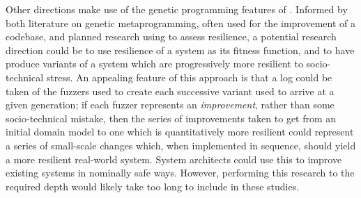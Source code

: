 \documentclass{article}
\begin{document}
Other directions make use of the genetic programming features of \pdsf{}.
Informed by both literature on genetic metaprogramming, often used for the
improvement of a codebase, and planned research using \pdsf{} to assess
resilience, a potential research direction could be to use resilience of a
system as its fitness function, and to have \pdsf{} produce variants of a
system which are progressively more resilient to socio-technical stress. An
appealing feature of this approach is that a log could be taken of the fuzzers
used to create each successive variant used to arrive at a given generation; if
each fuzzer represents an \emph{improvement}, rather than some socio-technical
mistake, then the series of improvements taken to get from an initial domain
model to one which is quantitatively more resilient could represent a series of
small-scale changes which, when implemented in sequence, should yield a more
resilient real-world system. System architects could use this to improve
existing systems in nominally safe ways. However, performing this research to
the required depth would likely take too long to include in these studies.\par


\newpage

\end{document}
